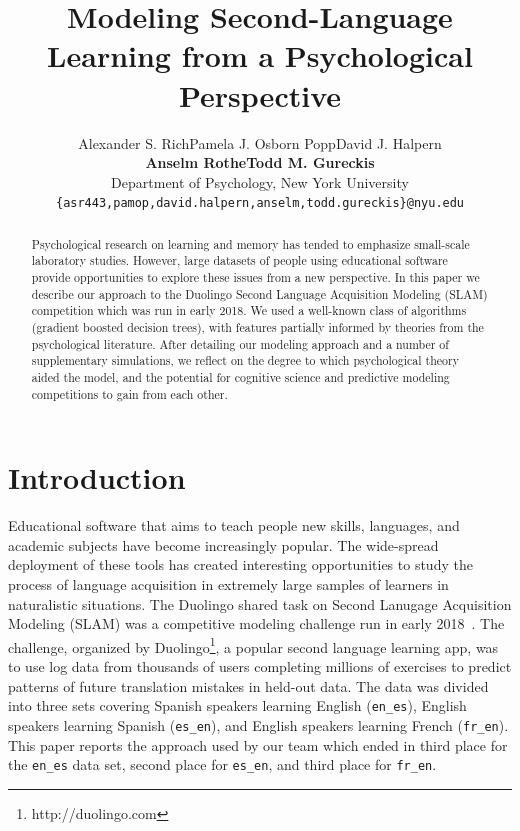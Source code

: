 \documentclass[11pt,a4paper]{article}
\title{Modeling Second-Language Learning from a Psychological Perspective}
\author{Alexander S. Rich\qquad Pamela J. Osborn Popp\qquad David J. Halpern\\
  \textbf{Anselm Rothe\qquad Todd M. Gureckis} \\
  Department of Psychology, New York University \\
  {\tt \{asr443,pamop,david.halpern,anselm,todd.gureckis\}@nyu.edu} \\}
\date{}
\begin{document}
\maketitle
\begin{abstract}
Psychological research on learning and memory
has tended to emphasize small-scale laboratory
studies.  However, large datasets of people using 
educational software provide opportunities to explore
these issues from a new perspective.  In this paper we
describe our approach to the Duolingo Second Language
Acquisition Modeling (SLAM) competition which was run in
early 2018.  We used a well-known class of algorithms (gradient boosted decision
trees), with features partially informed by theories from the psychological
literature. After detailing our modeling approach and a number of
supplementary simulations, we
reflect on the degree to which psychological theory aided the model, and
the potential for cognitive science and predictive modeling competitions to gain
from each other.
\end{abstract}

\section{Introduction}

Educational software that aims to teach people new skills, languages, and
academic subjects have become increasingly popular.  The wide-spread
deployment of these tools has created interesting opportunities to study
the process of language acquisition in extremely large samples of learners in naturalistic
situations. The Duolingo shared task on Second Lanugage Acquisition Modeling (SLAM)
was a competitive modeling challenge run in early 2018~\cite{slam18}.
The challenge, organized by Duolingo\footnote{http://duolingo.com}, a popular second
language learning app, was
to use log data from thousands of users completing millions of exercises to 
predict patterns of future translation mistakes in held-out data.  The data was
divided into three sets covering Spanish speakers learning English ({\tt en\_es}),
English speakers learning Spanish ({\tt es\_en}), and English speakers learning
French ({\tt fr\_en}).
This paper reports the approach used by our team which ended in third place 
for the {\tt en\_es} data set, second place for {\tt es\_en}, and third place
for {\tt fr\_en}.
\end{document}
